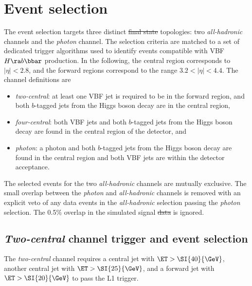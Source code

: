 \documentclass[PAPER, american,coverpage,texlive=2016, english]{\ATLASLATEXPATH atlasdoc}
\providecommand{\DIFadd}[1]{{\protect\color{blue}\uwave{#1}}} %
\providecommand{\DIFdel}[1]{{\protect\color{red}\sout{#1}}}                      %
\providecommand{\DIFaddbegin}{} %
\providecommand{\DIFaddend}{} %
\providecommand{\DIFdelbegin}{} %
\providecommand{\DIFdelend}{} %
\begin{document}
\section{Event selection}
\label{sec:selection}

The event selection targets three distinct \DIFdelbegin \DIFdel{final state }\DIFdelend \DIFaddbegin \DIFadd{final-state }\DIFaddend topologies: two \textit{all-hadronic} channels and the \textit{photon} channel.
The selection criteria are matched to a set of dedicated trigger algorithms used to identify events compatible with VBF $H\ra b\bbar$ production.
In the following, the central region corresponds to $|\eta|<2.8$, and the forward regions correspond to the range $3.2 < |\eta|<4.4$.
The channel definitions are
\begin{itemize}
   \item \textit{two-central}: at least one VBF jet is required to be in the forward region, and both $b$-tagged jets from the Higgs boson decay are in the central region,
\item \textit{four-central}: both VBF jets and both $b$-tagged jets from the Higgs boson decay are found in the central region of the detector, and
\item \textit{photon}: a photon and both $b$-tagged jets from the Higgs boson decay are found in the central region and both VBF jets are within the detector acceptance.
\end{itemize}
The selected events for the two \textit{all-hadronic} channels are mutually exclusive. 
The small overlap between the \textit{photon} and \textit{all-hadronic} channels is removed with an explicit veto of any data events in the \textit{all-hadronic} selection passing the \textit{photon} selection.
The 0.5\% overlap in the simulated signal \DIFdelbegin \DIFdel{data }\DIFdelend \DIFaddbegin \DIFadd{sample }\DIFaddend is ignored.

\subsection{\textit{Two-central} channel trigger and event selection}

The \textit{two-central} channel requires a central jet with $\ET > \SI{40}{\GeV}$, another central jet with $\ET > \SI{25}{\GeV}$, and a forward jet with $\ET > \SI{20}{\GeV}$ to pass the L1 trigger.
\end{document}
